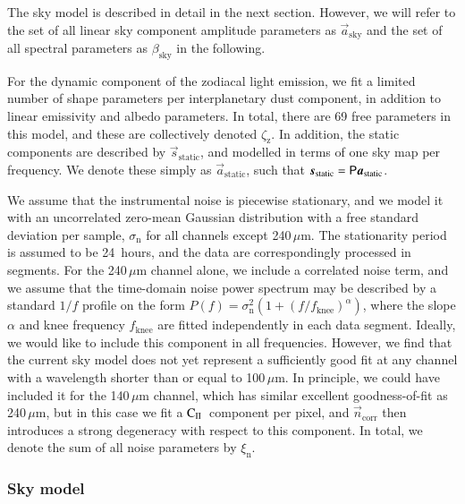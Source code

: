 \documentclass{aa}
\newcommand{\CII}{$\mathrm{C}_{\textsc{II}}$}
\newcommand{\n}[0]{\vec{n}}
\newcommand{\s}[0]{\vec{s}}
\renewcommand{\a}[0]{\vec{a}}
\renewcommand{\P}[0]{\tens{P}}
\begin{document}
The sky model is described in detail in the next section. However, we
will refer to the set of all linear sky component amplitude parameters
as $\a_{\mathrm{sky}}$ and the set of all spectral parameters as
$\beta_{\mathrm{sky}}$ in the following.

For the dynamic component of the zodiacal light emission, we fit a
limited number of shape parameters per interplanetary dust component,
in addition to linear emissivity and albedo parameters. In total,
there are 69 free parameters in this model, and these are collectively
denoted $\zeta_{\mathrm{z}}$. In addition, the static components are
described by $\s_{\mathrm{static}}$, and modelled in terms of one sky
map per frequency. We denote these simply as $\a_{\mathrm{static}}$,
such that $\s_{\mathrm{static}} = \P\a_{\mathrm{static}}$.

We assume that the instrumental noise is piecewise stationary, and we
model it with an uncorrelated zero-mean Gaussian distribution with a
free standard deviation per sample, $\sigma_{\mathrm{n}}$ for all
channels except 240\,$\mu$m. The stationarity period is assumed to be
24~hours, and the data are correspondingly processed in segments. For
the 240\,$\mu$m channel alone, we include a correlated noise term, and
we assume that the time-domain noise power spectrum may be described
by a standard $1/f$ profile on the form $P(f) = \sigma_{\mathrm{n}}^2
(1+(f/f_{\mathrm{knee}})^{\alpha})$, where the slope $\alpha$ and knee
frequency $f_{\mathrm{knee}}$ are fitted independently in each data
segment. Ideally, we would like to include this component in all
frequencies. However, we find that the current sky model does not yet
represent a sufficiently good fit at any channel with a wavelength
shorter than or equal to 100\,$\mu$m. In principle, we could have
included it for the 140\,$\mu$m channel, which has similar excellent
goodness-of-fit as 240\,$\mu$m, but in this case we fit a
\CII\ component per pixel, and $\n_{\mathrm{corr}}$ then introduces a
strong degeneracy with respect to this component. In total, we denote
the sum of all noise parameters by $\xi_{\mathrm{n}}$.

\subsubsection{Sky model}
\end{document}
